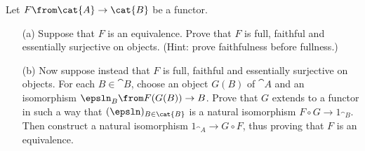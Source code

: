\begin{exercise}
Let $F\from \cat{A} \to \cat{B}$ be a functor.

        \begin{itemize}
        \item[(a)]
Suppose that $F$ is an equivalence.  Prove that $F$ is full, faithful and
essentially surjective on objects.  (Hint: prove faithfulness before
fullness.)

        \item[(b)]
Now suppose instead that $F$ is full, faithful and essentially surjective
on objects.  For each $B \in \cat{B}$, choose an object $G(B)$ of $\cat{A}$
and an isomorphism $\epsln_B\from F(G(B)) \to B$.  Prove that $G$ extends
to a functor in such a way that $(\epsln)_{B \in \cat{B}}$ is a natural
isomorphism $F \circ G \to 1_{\cat{B}}$.  Then construct a natural isomorphism
$1_{\cat{A}} \to G \circ F$, thus proving that $F$ is an equivalence.
        \end{itemize}
\end{exercise}
